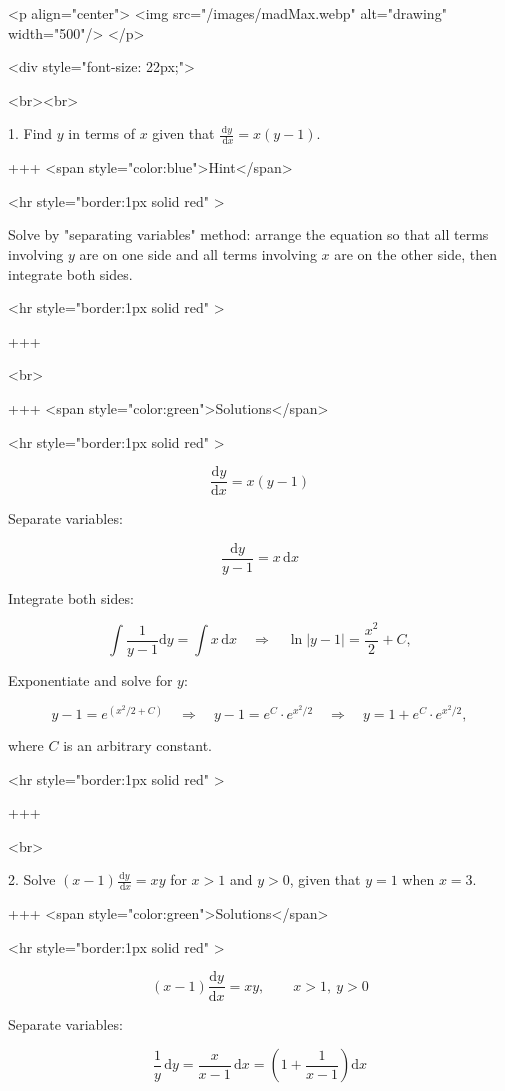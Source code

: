 <p align="center">
<img src="/images/madMax.webp" alt="drawing" width="500"/>
</p>

<div style="font-size: 22px;">

<br><br>

1. Find $y$ in terms of $x$ given that $\frac{\mathrm{d} y}{\mathrm{~d} x}=x(y-1)$.

+++ <span style="color:blue">Hint</span>

<hr style="border:1px solid red" >

Solve by "separating variables" method: arrange the equation so that all terms involving $y$ are on one side and all terms involving $x$ are on the other side, then integrate both sides.

<hr style="border:1px solid red" >

+++

<br>

+++ <span style="color:green">Solutions</span>

<hr style="border:1px solid red" >

$$
\frac{\mathrm{d}y}{\mathrm{d}x}=x(y-1)
$$

Separate variables:

$$
\frac{\mathrm{d}y}{y-1}=x\,\mathrm{d}x
$$


Integrate both sides:

$$
\int\frac{1}{y-1}\mathrm{d}y=\int x\,\mathrm{d}x
\quad\Rightarrow\quad
\ln\lvert y-1\rvert=\frac{x^2}{2}+C,
$$


Exponentiate and solve for $y$:

$$
y-1=e^{(x^2/2+C)}\quad\Rightarrow\quad
y-1=e^C \cdot e^{x^2/2}\quad\Rightarrow\quad
y=1+e^C \cdot e^{x^2/2},
$$

where $C$ is an arbitrary constant.

<hr style="border:1px solid red" >

+++

<br>

2. Solve $(x-1) \frac{\mathrm{d} y}{\mathrm{~d} x}=x y$ for $x>1$ and $y>0$, given that $y=1$ when $x=3$.

+++ <span style="color:green">Solutions</span>

<hr style="border:1px solid red" >

$$
(x-1)\frac{\mathrm{d}y}{\mathrm{d}x}=xy,\qquad x>1,\ y>0
$$

Separate variables:

$$
\frac{1}{y}\,\mathrm{d}y=\frac{x}{x-1}\,\mathrm{d}x
=\left(1+\frac{1}{x-1}\right)\mathrm{d}x
$$

